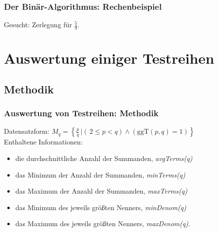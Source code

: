 \documentclass{beamer}
\begin{document}
\begin{frame}
\frametitle{Der Binär-Algorithmus: Rechenbeispiel}
	Gesucht: Zerlegung für $\frac{5}{9}$.
	\onslide<2->{$$8<9<16 \Rightarrow N_k = 16$$\\}
	\begin{center}
		    \only<7->{$ = \uf{2} + \uf{18}.$}
	\end{center}
\end{frame}

\section{Auswertung einiger Testreihen}
\subsection{Methodik}
\begin{frame}
	\frametitle{Auswertung von Testreihen: Methodik}
	Datensatzform: $M_q = \left\{ \frac{p}{q} \, | \left(\, 2\leq p < q\right) \wedge \left(\text{ggT}(p,q) = 1\right)\right\}$\\ \vspace{1cm}
	Enthaltene Informationen:
	\begin{itemize}
		\item die durchschnittliche Anzahl der Summanden, \emph{avgTerms(q)}
		\item das Minimum der Anzahl der Summanden, \emph{minTerms(q)}
		\item das Maximum der Anzahl der Summanden, \emph{maxTerms(q)}
		\item das Minimum des jeweils größten Nenners, \emph{minDenom(q)}
		\item das Maximum des jeweils größten Nenners, \emph{maxDenom(q)}.
	\end{itemize}
\end{frame}
\end{document}
